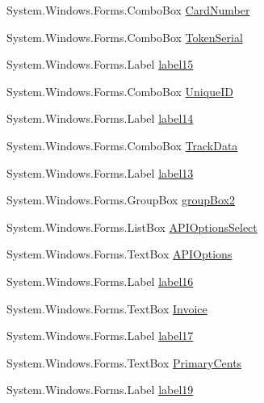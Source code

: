 \begin{DoxyCompactItemize}
System.\+Windows.\+Forms.\+Combo\+Box \mbox{\hyperlink{class_form_sim_1_1_form1_a59d375ea0a88d92e37ca60a1758f0393}{Card\+Number}}
\item 
System.\+Windows.\+Forms.\+Combo\+Box \mbox{\hyperlink{class_form_sim_1_1_form1_a2e0b28b22c6ce97d2f980691e85b33c6}{Token\+Serial}}
\item 
System.\+Windows.\+Forms.\+Label \mbox{\hyperlink{class_form_sim_1_1_form1_a5ddc0a1b8a7e6e78cb6cbc43d73dc307}{label15}}
\item 
System.\+Windows.\+Forms.\+Combo\+Box \mbox{\hyperlink{class_form_sim_1_1_form1_ae61e0632600eb8b5d969ff4b0917ec87}{Unique\+ID}}
\item 
System.\+Windows.\+Forms.\+Label \mbox{\hyperlink{class_form_sim_1_1_form1_a3ca2ec314a631948f7a626a94025aee5}{label14}}
\item 
System.\+Windows.\+Forms.\+Combo\+Box \mbox{\hyperlink{class_form_sim_1_1_form1_a14c01f57c5847acb8b9989cdb59ff0a0}{Track\+Data}}
\item 
System.\+Windows.\+Forms.\+Label \mbox{\hyperlink{class_form_sim_1_1_form1_ac5456a8c4f7cb00b6b8584064af29b40}{label13}}
\item 
System.\+Windows.\+Forms.\+Group\+Box \mbox{\hyperlink{class_form_sim_1_1_form1_a9f2831eaf955dcf9f776b20903b6e487}{group\+Box2}}
\item 
System.\+Windows.\+Forms.\+List\+Box \mbox{\hyperlink{class_form_sim_1_1_form1_a05c5787e91c73340fa98391b1deda267}{A\+P\+I\+Options\+Select}}
\item 
System.\+Windows.\+Forms.\+Text\+Box \mbox{\hyperlink{class_form_sim_1_1_form1_a624a8c6064e2d2cb379a41185901f897}{A\+P\+I\+Options}}
\item 
System.\+Windows.\+Forms.\+Label \mbox{\hyperlink{class_form_sim_1_1_form1_a9335909ad1a4e1650f7fe6b9ec6204a4}{label16}}
\item 
System.\+Windows.\+Forms.\+Text\+Box \mbox{\hyperlink{class_form_sim_1_1_form1_ac5e5b6ff1f100057f95dc8ef2863e73d}{Invoice}}
\item 
System.\+Windows.\+Forms.\+Label \mbox{\hyperlink{class_form_sim_1_1_form1_a06b45b77a210d9aade9c7f8bc5f098cf}{label17}}
\item 
System.\+Windows.\+Forms.\+Text\+Box \mbox{\hyperlink{class_form_sim_1_1_form1_ade11df97d9e42cb5bfa48face25aee61}{Primary\+Cents}}
\item 
System.\+Windows.\+Forms.\+Label \mbox{\hyperlink{class_form_sim_1_1_form1_a2a0b326231f8846b6a83dad3412f1cd6}{label19}}
\item 

\end{DoxyCompactItemize}
